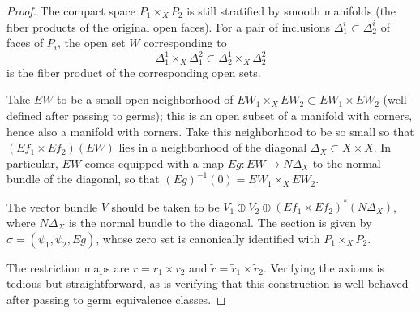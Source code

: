 \documentclass[10pt,a4paper]{amsart}
\theoremstyle{definition}
\theoremstyle{remark}
\numberwithin{figure}{qchap}
\begin{document}

\begin{proof}
The compact space $P_1 \times_X P_2$ is still stratified by smooth manifolds (the fiber products of the original open faces). For a pair of inclusions $\Delta_1^i \subset \Delta_2^i$ of faces of $P_i$, the open set $W$ corresponding to $$\Delta_1^1 \times_X \Delta_1^2 \subset \Delta_2^1 \times_X \Delta_2^2$$ is the fiber product of the corresponding open sets. 

Take $EW$ to be a small open neighborhood of $EW_1 \times_X EW_2 \subset EW_1 \times EW_2$ (well-defined after passing to germs); this is an open subset of a manifold with corners, hence also a manifold with corners. Take this neighborhood to be so small so that $(Ef_1 \times Ef_2)(EW)$ lies in a neighborhood of the diagonal $\Delta_X \subset X \times X$. In particular, $EW$ comes equipped with a map $Eg: EW \to N\Delta_X$ to the normal bundle of the diagonal, so that $(Eg)^{-1}(0) = EW_1 \times_X EW_2$. 

The vector bundle $V$ should be taken to be $V_1 \oplus V_2 \oplus (Ef_1 \times Ef_2)^*(N \Delta_X)$, where $N\Delta_X$ is the normal bundle to the diagonal. The section is given by $\sigma = (\psi_1, \psi_2, Eg)$, whose zero set is canonically identified with $P_1 \times_X P_2$. 

The restriction maps are $r = r_1 \times r_2$ and $\widetilde r = \widetilde r_1 \times \widetilde r_2$. Verifying the axioms is tedious but straightforward, as is verifying that this construction is well-behaved after passing to germ equivalence classes. 
\end{proof}
\end{document}
